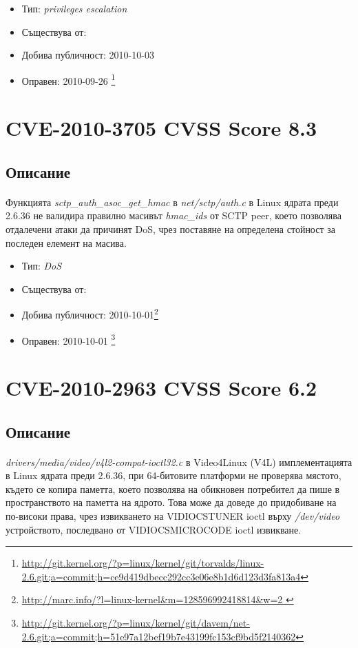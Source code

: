 \documentclass[a4paper,12pt,leqno]{article}
\begin{document}
\begin{itemize}
    \item Тип: \textit{privileges escalation}
    \item Съществува от:
  	\item Добива публичност: 2010-10-03
    \item Оправен: 2010-09-26 \footnote{\url{http://git.kernel.org/?p=linux/kernel/git/torvalds/linux-2.6.git;a=commit;h=ce9d419dbecc292cc3e06e8b1d6d123d3fa813a4}}
\end{itemize}


\section{CVE-2010-3705 CVSS Score 8.3}
\subsection{Описание}
\paragraph{}
Функцията \textit{sctp\_auth\_asoc\_get\_hmac} в\textit{ net/sctp/auth.c} в Linux ядрата преди 2.6.36 не валидира правилно масивът \textit{hmac\_ids} от SCTP peer, което позволява отдалечени атаки да причинят DoS, чрез поставяне на определена стойност за последен елемент на масива.

\begin{itemize}
    \item Тип: \textit{DoS}
    \item Съществува от:
  	\item Добива публичност: 2010-10-01\footnote{\url{http://marc.info/?l=linux-kernel&m=128596992418814&w=2	}}
    \item Оправен: 2010-10-01 \footnote{\url{http://git.kernel.org/?p=linux/kernel/git/davem/net-2.6.git;a=commit;h=51e97a12bef19b7e43199fc153cf9bd5f2140362}}
\end{itemize}


\section{CVE-2010-2963 CVSS Score 6.2}
\subsection{Описание}
\paragraph{}
\textit{drivers/media/video/v4l2-compat-ioctl32.c} в Video4Linux (V4L) имплементацията в Linux ядрата преди 2.6.36, при 64-битовите платформи не проверява мястото, където се копира паметта, което позволява на обикновен потребител да пише в пространството на паметта на ядрото. Това може да доведе до придобиване на по-високи права, чрез извикването на VIDIOCSTUNER ioctl върху \textit{/dev/video} устройството, последвано от VIDIOCSMICROCODE ioctl извикване.
\end{document}
